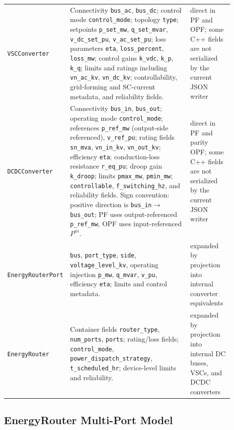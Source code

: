 \begin{longtable}{L{0.20\linewidth}L{0.53\linewidth}L{0.19\linewidth}}
\texttt{VSCConverter} & Connectivity \texttt{bus\_ac}, \texttt{bus\_dc}; control mode \texttt{control\_mode}; topology \texttt{type}; setpoints \texttt{p\_set\_mw}, \texttt{q\_set\_mvar}, \texttt{v\_dc\_set\_pu}, \texttt{v\_ac\_set\_pu}; loss parameters \texttt{eta}, \texttt{loss\_percent}, \texttt{loss\_mw}; control gains \texttt{k\_vdc}, \texttt{k\_p}, \texttt{k\_q}; limits and ratings including \texttt{vn\_ac\_kv}, \texttt{vn\_dc\_kv}; controllability, grid-forming and SC-current metadata, and reliability fields. & direct in PF and OPF; some C++ fields are not serialized by the current JSON writer \\
\texttt{DCDCConverter} & Connectivity \texttt{bus\_in}, \texttt{bus\_out}; operating mode \texttt{control\_mode}; references \texttt{p\_ref\_mw} (output-side referenced), \texttt{v\_ref\_pu}; rating fields \texttt{sn\_mva}, \texttt{vn\_in\_kv}, \texttt{vn\_out\_kv}; efficiency \texttt{eta}; conduction-loss resistance \texttt{r\_eq\_pu}; droop gain \texttt{k\_droop}; limits \texttt{pmax\_mw}, \texttt{pmin\_mw}; \texttt{controllable}, \texttt{f\_switching\_hz}, and reliability fields.  Sign convention: positive direction is \texttt{bus\_in}\(\to\)\texttt{bus\_out}; PF uses output-referenced \texttt{p\_ref\_mw}, OPF uses input-referenced \(P^{in}\). & direct in PF and parity OPF; some C++ fields are not serialized by the current JSON writer \\
\texttt{EnergyRouterPort} & \texttt{bus}, \texttt{port\_type}, \texttt{side}, \texttt{voltage\_level\_kv}, operating injection \texttt{p\_mw}, \texttt{q\_mvar}, \texttt{v\_pu}, efficiency \texttt{eta}; limits and control metadata. & expanded by projection into internal converter equivalents \\
\texttt{EnergyRouter} & Container fields \texttt{router\_type}, \texttt{num\_ports}, \texttt{ports}; rating/loss fields; \texttt{control\_mode}, \texttt{power\_dispatch\_strategy}, \texttt{t\_scheduled\_hr}; device-level limits and reliability. & expanded by projection into internal DC buses, VSCs, and DCDC converters \\
\bottomrule
\end{longtable}

\subsection{EnergyRouter Multi-Port Model}
\label{sec:er-multiport}

